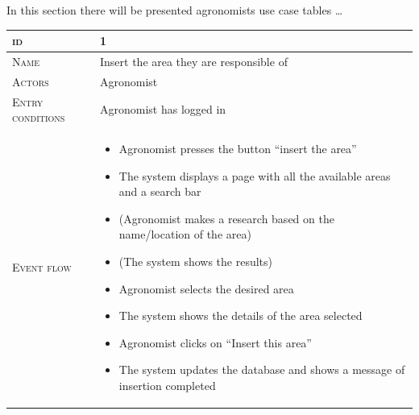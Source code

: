 In this section there will be presented agronomists use case tables \ldots

\begin{table}[H]
    \centering
    \begin{tabular}[c]{|l|p{}|}
        \hline %
    	\textsc{id}                 &   1\\
    	\hline %
    	\textsc{Name}               &   Insert the area they are responsible of\\
    	\hline %
    	\textsc{Actors}             &   Agronomist\\
    	\hline %
    	\textsc{Entry conditions}   &   Agronomist has logged in\\
    	\hline %
    	\textsc{Event flow}         &   %
            	                        \begin{itemize}
                                    	    \item Agronomist presses the button “insert the area”
                                    		\item The system displays a page with all the available areas and a search bar
                                    		\item (Agronomist makes a research based on the name/location of the area)
                                    		\item (The system shows the results)
                                    		\item Agronomist selects the desired area
                                    		\item The system shows the details of the area selected
                                    		\item Agronomist clicks on “Insert this area”
                                    		\item The system updates the database and shows a message of insertion completed
                                        \end{itemize}\\
        \hline %

\end{tabular}
\end{table}
